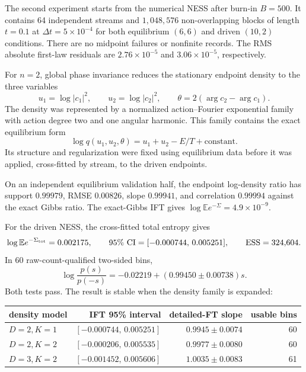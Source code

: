 \documentclass[11pt]{article}
\newcommand{\E}{\mathbb E}
\newcommand{\dt}{\Delta t}
\begin{document}
The second experiment starts from the numerical NESS after burn-in $B=500$.
It contains 64 independent streams and $1{,}048{,}576$ non-overlapping blocks
of length $t=0.1$ at $\dt=5\times10^{-4}$ for both equilibrium $(6,6)$ and
driven $(10,2)$ conditions.  There are no midpoint failures or nonfinite
records.  The RMS absolute first-law residuals are $2.76\times10^{-5}$ and
$3.06\times10^{-5}$, respectively.

For $n=2$, global phase invariance reduces the stationary endpoint density to
the three variables
\[
 u_1=\log|c_1|^2,\qquad u_2=\log|c_2|^2,
 \qquad \theta=2(\arg c_2-\arg c_1).
\]
The density was represented by a normalized action--Fourier exponential
family with action degree two and one angular harmonic.  This family contains
the exact equilibrium form
\[
 \log q(u_1,u_2,\theta)=u_1+u_2-E/T+\mathrm{constant}.
\]
Its structure and regularization were fixed using equilibrium data before it
was applied, cross-fitted by stream, to the driven endpoints.

On an independent equilibrium validation half, the endpoint log-density ratio
has support $0.99979$, RMSE $0.00826$, slope $0.99941$, and correlation
$0.99994$ against the exact Gibbs ratio.  The exact-Gibbs IFT gives
$\log\E e^{-\Sigma}=4.9\times10^{-9}$.

For the driven NESS, the cross-fitted total entropy gives
\begin{equation}
 \log\E e^{-\Sigma_{\rm tot}}=0.002175,
 \qquad 95\%\ \mathrm{CI}=[-0.000744,\,0.005251],
 \qquad \mathrm{ESS}=324{,}604.
\end{equation}
In 60 raw-count-qualified two-sided bins,
\begin{equation}
 \log\frac{p(s)}{p(-s)}
 =-0.02219+(0.99450\pm0.00738)s.
 \label{eq:ness-fit}
\end{equation}
Both tests pass.  The result is stable when the density family is expanded:
\begin{table}[h]
\centering
\begin{tabular}{lrrr}
\toprule
density model & IFT 95\% interval & detailed-FT slope & usable bins \\
\midrule
$D=2,K=1$ & $[-0.000744,\,0.005251]$ & $0.9945\pm0.0074$ & 60 \\
$D=2,K=2$ & $[-0.000206,\,0.005535]$ & $0.9977\pm0.0080$ & 60 \\
$D=3,K=2$ & $[-0.001452,\,0.005606]$ & $1.0035\pm0.0083$ & 61 \\
\bottomrule
\end{tabular}
\end{table}
\end{document}
